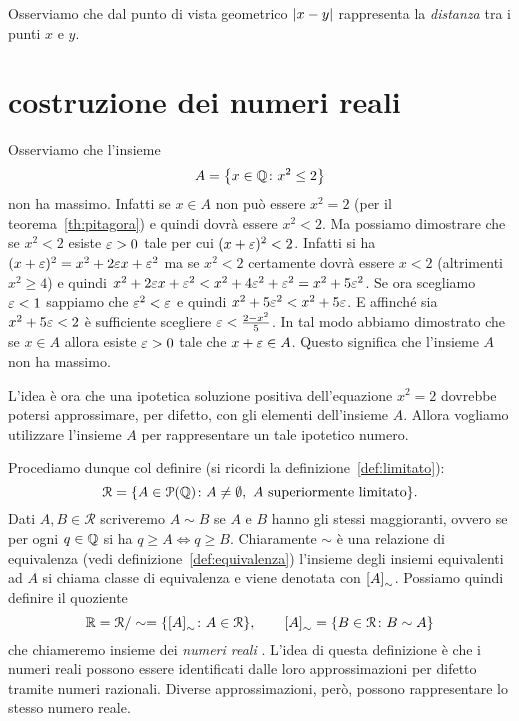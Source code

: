 Osserviamo che dal punto di vista geometrico
${\left|x-y\right|}$ rappresenta la \emph{distanza} tra i punti
$x$ e $y$.

\section{costruzione dei numeri reali}

Osserviamo che l'insieme 
\[
 A = {\left\{ x\in {\mathbb Q} \colon x^2 \le 2 \right\}}  
\]
non ha massimo. 
Infatti se $x\in A$ non può essere $x^2=2$ (per il teorema~\ref{th:pitagora})
e quindi dovrà essere $x^2<2$. 
Ma possiamo dimostrare che se $x^2<2$ esiste $\varepsilon>0$ tale per cui $(x+\varepsilon)^2<2$. 
Infatti si ha $(x+\varepsilon)^2 = x^2 + 2\varepsilon x + \varepsilon^2$
ma se $x^2<2$ certamente dovrà essere $x<2$ (altrimenti $x^2\ge 4$)
e quindi $x^2+2\varepsilon x+\varepsilon^2 < x^2+ 4\varepsilon^2+\varepsilon^2 = x^2+5\varepsilon^2$.
Se ora scegliamo $\varepsilon<1$ sappiamo che $\varepsilon^2<\varepsilon$ 
e quindi $x^2+5\varepsilon^2 < x^2 + 5\varepsilon$. 
E affinché sia $x^2 + 5\varepsilon < 2$ è sufficiente scegliere 
$\varepsilon < \frac{2-x^2}{5}$. 
In tal modo abbiamo dimostrato che se $x\in A$ allora esiste 
$\varepsilon>0$ tale che $x+\varepsilon \in A$. 
Questo significa che l'insieme $A$ non ha massimo.

L'idea è ora che una ipotetica soluzione positiva dell'equazione $x^2=2$ 
dovrebbe potersi approssimare, per difetto, con gli elementi dell'insieme $A$.
Allora vogliamo utilizzare l'insieme $A$ per rappresentare un tale ipotetico numero.

Procediamo dunque col definire (si ricordi la definizione~\ref{def:limitato}):
\[
\mathcal R = {\left\{ A \in \mathcal P({\mathbb Q})\colon A\neq \emptyset, \text{ $A$ superiormente 
limitato} \right\}}.
\]
Dati $A,B\in \mathcal R$ scriveremo $A\sim B$ 
se $A$ e $B$ hanno gli stessi maggioranti, ovvero
se per ogni $q\in {\mathbb Q}$ si ha $q\ge A \iff q\ge B$.
Chiaramente $\sim$ è una relazione di equivalenza (vedi definizione~\ref{def:equivalenza})
l'insieme degli insiemi equivalenti ad $A$ si chiama 
classe di equivalenza e viene denotata con ${\left[ A \right]}_\sim$.
Possiamo quindi definire il quoziente
\[
  {\mathbb R} = \mathcal R / \sim = {\left\{ {\left[ A \right]}_\sim\colon A\in \mathcal R \right\}},
  \qquad 
  {\left[ A \right]}_\sim = {\left\{ B\in \mathcal R\colon B\sim A \right\}}
\]
che chiameremo insieme dei \emph{numeri reali}%
%
.
L'idea di questa definizione è che i numeri reali 
possono essere identificati dalle loro approssimazioni 
per difetto tramite numeri razionali. 
Diverse approssimazioni, però, possono rappresentare 
lo stesso numero reale.

